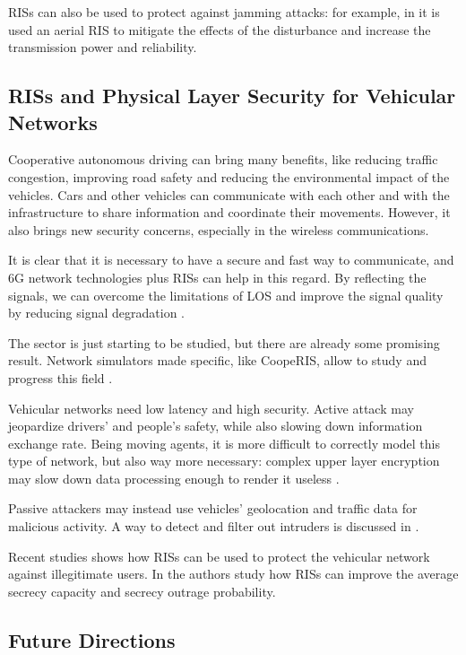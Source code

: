 RISs can also be used to protect against jamming attacks: for example, in \cite{9424472} it is used an aerial RIS to mitigate the effects of the disturbance and increase the transmission power and reliability.

\subsection{RISs and Physical Layer Security for Vehicular Networks}

Cooperative autonomous driving can bring many benefits, like reducing traffic congestion, improving road safety and reducing the environmental impact of the vehicles. Cars and other vehicles can communicate with each other and with the infrastructure to share information and coordinate their movements. However, it also brings new security concerns, especially in the wireless communications.

It is clear that it is necessary to have a secure and fast way to communicate, and 6G network technologies plus RISs can help in this regard. By reflecting the signals, we can overcome the limitations of LOS and improve the signal quality by reducing signal degradation \cite{10715713}.

The sector is just starting to be studied, but there are already some promising result. Network simulators made specific, like CoopeRIS, allow to study and progress this field \cite{SEGATA2024110443}.

Vehicular networks need low latency and high security. Active attack may jeopardize drivers' and people's safety, while also slowing down information exchange rate. Being moving agents, it is more difficult to correctly model this type of network, but also way more necessary: complex upper layer encryption may slow down data processing enough to render it useless \cite{8403278}.

Passive attackers may instead use vehicles' geolocation and traffic data for malicious activity. A way to detect and filter out intruders is discussed in \cite{8474336}.

Recent studies shows how RISs can be used to protect the vehicular network against illegitimate users. In \cite{makarfi2020reconfigurableintelligentsurfacesenabledvehicular} the authors study how RISs can improve the average secrecy capacity and secrecy outrage probability.

\subsection{Future Directions}

